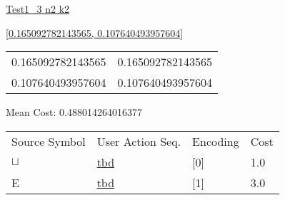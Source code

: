 \documentclass[12pt]{article}
\begin{document}
\noindent \url{Test1_3 n2 k2}

\noindent \url{[0.165092782143565, 0.107640493957604]}

\noindent\begin{tt}
\begin{small}
\begin{bundle}{}
\end{bundle}
\end{small}
\end{tt}
\newpage%
\begin{tabular}{l l}0.165092782143565	&	0.165092782143565\\
0.107640493957604	&	0.107640493957604\\
\end{tabular}\newpage
\noindent
\noindent Mean Cost: 0.488014264016377\\
\begin{tabular}{l l l l}
Source Symbol	&	User Action Seq.	&	Encoding	&	Cost\\
$\sqcup$	&	\url{tbd}	&	[0]	&	1.0\\
E	&	\url{tbd}	&	[1]	&	3.0\\
\end{tabular}
\end{document}
